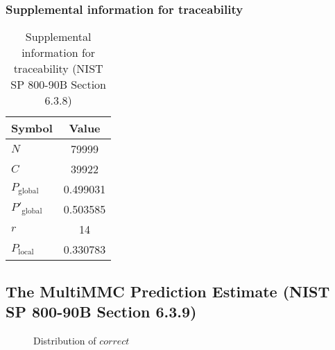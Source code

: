 \documentclass[a3paper,xelatex,english]{bxjsarticle}
\begin{document}
\subsubsection{Supplemental information for traceability}
\renewcommand{\arraystretch}{1.8}
\begin{table}[h]
\caption{Supplemental information for traceability (NIST SP 800-90B Section 6.3.8)}
\begin{center}
\begin{tabular}{|l|c|}
\hline 
\rowcolor{anotherlightblue} %
Symbol				& Value \\ \hline 
$N$				& 79999\\ \hline 
$C$				& 39922\\ \hline 
$P_{\textrm{global}}$				& 0.499031\\ \hline 
$P'_{\textrm{global}}$			& 0.503585\\ \hline 
$r$				& 14\\ \hline 
$P_{\textrm{local}}$ 			& 0.330783\\ \hline
\end{tabular}
\end{center}
\end{table}
\renewcommand{\arraystretch}{1.4}
\clearpage
\subsection{The MultiMMC Prediction Estimate (NIST SP 800-90B Section 6.3.9)}
\begin{figure}[htbp]
\caption{Distribution of $correct$}
\end{figure}
\end{document}
